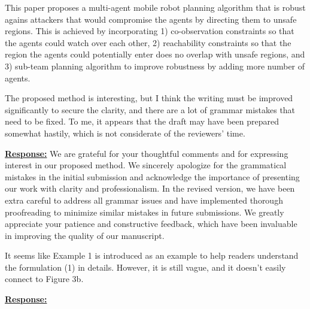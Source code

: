\documentclass{article}
\begin{document}
\begin{cmt*}{}{}

	This paper proposes a multi-agent mobile robot planning algorithm that
	is robust agains attackers that would compromise the agents by
	directing them to unsafe regions. This is achieved by incorporating 1)
	co-observation constraints so that the agents could watch over each
	other, 2) reachability constraints so that the region the agents could
	potentially enter does no overlap with unsafe regions, and 3) sub-team
	planning algorithm to improve robustness by adding more number of
	agents.
	
	The proposed method is interesting, but I think the writing must be
	improved significantly to secure the clarity, and there are a lot of
	grammar mistakes that need to be fixed. To me, it appears that the
	draft may have been prepared somewhat hastily, which is not considerate
	of the reviewers' time.

\end{cmt*}
\vspace{0.1cm}
\noindent
\underline{\textbf{Response:}}
\vspace{0.2cm}
We are grateful for your thoughtful comments and for expressing interest in our proposed method. We sincerely apologize for the grammatical mistakes in the initial submission and acknowledge the importance of presenting our work with clarity and professionalism. In the revised version, we have been extra careful to address all grammar issues and have implemented thorough proofreading to minimize similar mistakes in future submissions. We greatly appreciate your patience and constructive feedback, which have been invaluable in improving the quality of our manuscript.

\vspace{0.3cm}


\begin{cmt}{}{}        %
	It seems like Example 1 is introduced as an example to help
	readers understand the formulation (1) in details. However, it is still
	vague, and it doesn't easily connect to Figure 3b.
\end{cmt}
\vspace{0.1cm}
\noindent
\underline{\textbf{Response:}}
\vspace{0.2cm}
\end{document}

